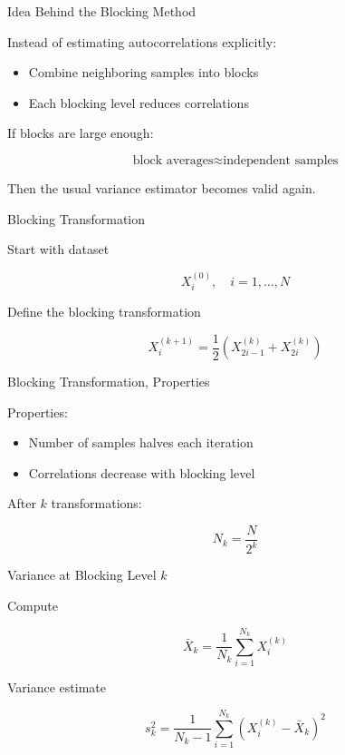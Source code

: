 \documentclass{beamer}
\begin{document}

\begin{frame}{Idea Behind the Blocking Method}

  Instead of estimating autocorrelations explicitly:

  \begin{itemize}
  \item Combine neighboring samples into blocks
  \item Each blocking level reduces correlations
  \end{itemize}

  If blocks are large enough:

  \[
  \text{block averages} \approx \text{independent samples}
  \]

  Then the usual variance estimator becomes valid again.
\end{frame}


\begin{frame}{Blocking Transformation}

  Start with dataset

  \[
  X^{(0)}_i, \quad i=1,\dots,N
  \]

  Define the blocking transformation

  \[
  X^{(k+1)}_i
  =
  \frac{1}{2}
  \left(
  X^{(k)}_{2i-1}
  +
  X^{(k)}_{2i}
  \right)
  \]

\end{frame}



\begin{frame}{Blocking Transformation, Properties}

  Properties:

  \begin{itemize}
  \item Number of samples halves each iteration
  \item Correlations decrease with blocking level
  \end{itemize}

  After $k$ transformations:

  \[
  N_k = \frac{N}{2^k}
  \]
\end{frame}




\begin{frame}{Variance at Blocking Level $k$}

  Compute

  \[
  \bar X_k
  =
  \frac{1}{N_k}
  \sum_{i=1}^{N_k} X^{(k)}_i
  \]

  Variance estimate

  \[
  s_k^2
  =
  \frac{1}{N_k-1}
  \sum_{i=1}^{N_k}
  \left(
  X^{(k)}_i - \bar X_k
  \right)^2
  \]

\end{frame}
\end{document}
